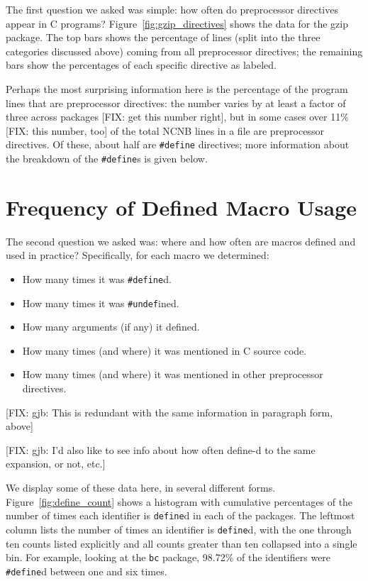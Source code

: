 The first question we asked was simple: how often do preprocessor
directives appear in C programs?  Figure~\ref{fig:gzip_directives} shows
the data for the gzip package.  The top bars shows the percentage of
lines (split into the three categories discussed above) coming from all
preprocessor directives; the remaining bars show the percentages of each
specific directive as labeled. 

Perhaps the most surprising information here is the percentage of the
program lines that are preprocessor directives: the number varies by
at least a factor of three across packages [FIX: get this number
right], but in some cases over 11\% [FIX: this number, too] of the
total NCNB lines in a file are preprocessor directives.  Of these,
about half are \verb+#define+ directives; more information about the
breakdown of the \verb+#define+s is given below.

\section{Frequency of Defined Macro Usage}\label{sec:usage}

The second question we asked was: where and how often are macros
defined and used in practice?  Specifically, for each macro we
determined:
\begin{itemize}

\item How many times it was \verb+#define+d.
\item How many times it was \verb+#undef+ined.
\item How many arguments (if any) it defined.
\item How many times (and where) it was mentioned in C source code.
\item How many times (and where) it was mentioned in other
preprocessor directives.

\end{itemize}
[FIX: gjb: This is redundant with the same information in paragraph
form, above]

[FIX: gjb: I'd also like to see info about how often define-d to the same
expansion, or not, etc.]


We display some of these data here, in several different forms.
Figure~\ref{fig:define_count} shows a histogram with cumulative
percentages of the number of times each identifier is \verb+define+d
in each of the packages.  The leftmost column lists the number of
times an identifier is \verb+define+d, with the one through ten counts
listed explicitly and all counts greater than ten collapsed into a
single bin.  For example, looking at the \verb+bc+ package, 98.72\% of
the identifiers were \verb+#define+d between one and six times.


